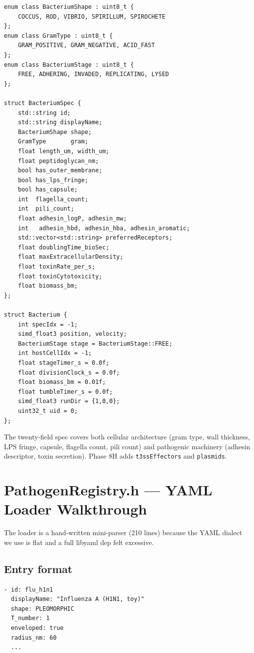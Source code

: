 \documentclass[11pt,letterpaper,twoside,openany]{book}
\newcommand{\code}[1]{\texttt{#1}}
\begin{document}
\begin{lstlisting}
enum class BacteriumShape : uint8_t {
    COCCUS, ROD, VIBRIO, SPIRILLUM, SPIROCHETE
};
enum class GramType : uint8_t {
    GRAM_POSITIVE, GRAM_NEGATIVE, ACID_FAST
};
enum class BacteriumStage : uint8_t {
    FREE, ADHERING, INVADED, REPLICATING, LYSED
};

struct BacteriumSpec {
    std::string id;
    std::string displayName;
    BacteriumShape shape;
    GramType       gram;
    float length_um, width_um;
    float peptidoglycan_nm;
    bool has_outer_membrane;
    bool has_lps_fringe;
    bool has_capsule;
    int  flagella_count;
    int  pili_count;
    float adhesin_logP, adhesin_mw;
    int   adhesin_hbd, adhesin_hba, adhesin_aromatic;
    std::vector<std::string> preferredReceptors;
    float doublingTime_bioSec;
    float maxExtracellularDensity;
    float toxinRate_per_s;
    float toxinCytotoxicity;
    float biomass_bm;
};

struct Bacterium {
    int specIdx = -1;
    simd_float3 position, velocity;
    BacteriumStage stage = BacteriumStage::FREE;
    int hostCellIdx = -1;
    float stageTimer_s = 0.0f;
    float divisionClock_s = 0.0f;
    float biomass_bm = 0.01f;
    float tumbleTimer_s = 0.0f;
    simd_float3 runDir = {1,0,0};
    uint32_t uid = 0;
};
\end{lstlisting}

The twenty-field spec covers both cellular architecture (gram type,
wall thickness, LPS fringe, capsule, flagella count, pili count)
and pathogenic machinery (adhesin descriptor, toxin secretion).
Phase 8H adds \code{t3ssEffectors} and \code{plasmids}.

\chapter{PathogenRegistry.h --- YAML Loader Walkthrough}
\label{ch:pathogen-registry-line}

The loader is a hand-written mini-parser (210 lines) because the
YAML dialect we use is flat and a full libyaml dep felt excessive.

\section{Entry format}

\begin{verbatim}
- id: flu_h1n1
  displayName: "Influenza A (H1N1, toy)"
  shape: PLEOMORPHIC
  T_number: 1
  enveloped: true
  radius_nm: 60
  ...
\end{verbatim}
\end{document}
